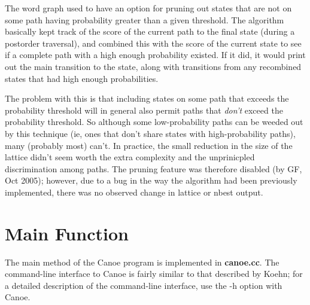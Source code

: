 \documentclass[12pt]{amsart} \usepackage{epsfig} \usepackage{rotating}
\newcommand{\file}{\textbf} \newcommand{\url}{\underline}
\begin{document}
The word graph used to have an option for pruning out states that are not on
some path having probability greater than a given threshold.  The algorithm
basically kept track of the score of the current path to the final state
(during a postorder traversal), and combined this with the score of the current
state to see if a complete path with a high enough probability existed. If it
did, it would print out the main transition to the state, along with
transitions from any recombined states that had high enough probabilities.

The problem with this is that including states on some path that exceeds the
probability threshold will in general also permit paths that {\em don't} exceed
the probability threshold. So although some low-probability paths can be weeded
out by this technique (ie, ones that don't share states with high-probability
paths), many (probably most) can't. In practice, the small reduction in the
size of the lattice didn't seem worth the extra complexity and the unprinicpled
discrimination among paths. The pruning feature was therefore disabled (by GF,
Oct 2005); however, due to a bug in the way the algorithm had been previously
implemented, there was no observed change in lattice or nbest output.

\section{Main Function}
The main method of the Canoe program is implemented in \file{canoe.cc}.  The
command-line interface to Canoe is fairly similar to that described by Koehn;
for a detailed description of the command-line interface, use the -h option
with Canoe.

 
\end{document}
